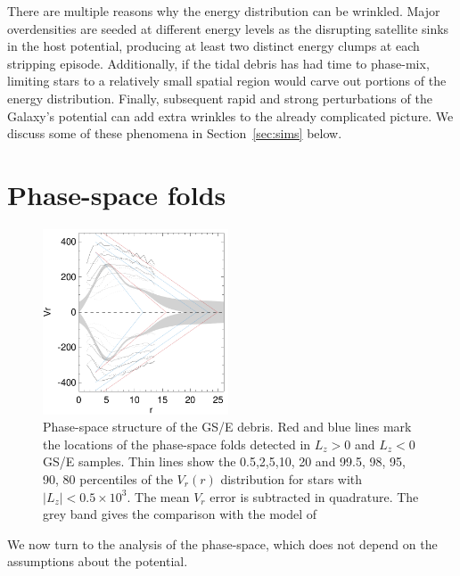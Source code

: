 \documentclass[a4paper,useAMS,usenatbib]{mnras}
\newcommand{\ev}[1]{\textcolor{magenta}{[{\bf EV}: #1]}}
\begin{document}
There are multiple reasons why the energy distribution can be wrinkled. Major overdensities are seeded at different energy levels as the disrupting satellite sinks in the host potential, producing at least two distinct energy clumps at each stripping episode. Additionally, if the tidal debris has had time to phase-mix, limiting stars to a relatively small spatial region would carve out portions of the energy distribution. Finally, subsequent rapid and strong perturbations of the Galaxy's potential can add extra wrinkles to the already complicated picture. We discuss some of these phenomena in Section~\ref{sec:sims} below.

\section{Phase-space folds}
\label{sec:phase-space}

%
\begin{figure}
  \centering
  \includegraphics[width=0.49\textwidth]{img/maxvr_r.pdf}
  \caption[]{Phase-space structure of the GS/E debris. Red and blue lines mark the locations of the phase-space folds detected in $L_z>0$ and $L_z<0$ GS/E samples. Thin lines show the 0.5,2,5,10, 20 and 99.5, 98, 95, 90, 80 percentiles of the $V_r(r)$ distribution for stars with $|L_z|<0.5\times10^3$. The mean $V_r$ error is subtracted in quadrature. The grey band gives the comparison with the model of \citet{Iorio2021}}
   \label{fig:vrr_max}
\end{figure}
%

We now turn to the analysis of the phase-space, which does not depend on the assumptions about the potential. %
\end{document}

